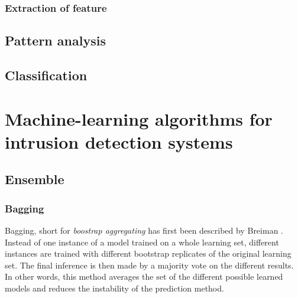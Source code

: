 \subsubsection{Extraction of feature}


\subsection{Pattern analysis}


\subsection{Classification}




\section{Machine-learning algorithms for intrusion detection systems}

\subsection{Ensemble}

\subsubsection{Bagging}
Bagging, short for \emph{boostrap aggregating} has first been described by Breiman \cite{Breiman1996BaggingPredictors}. Instead of one instance of a model trained on a whole learning set, different instances are trained with different bootstrap replicates of the original learning set. The final inference is then made by a majority vote on the different results. In other words, this method averages the set of the different possible learned models and reduces the instability of the prediction method. 

